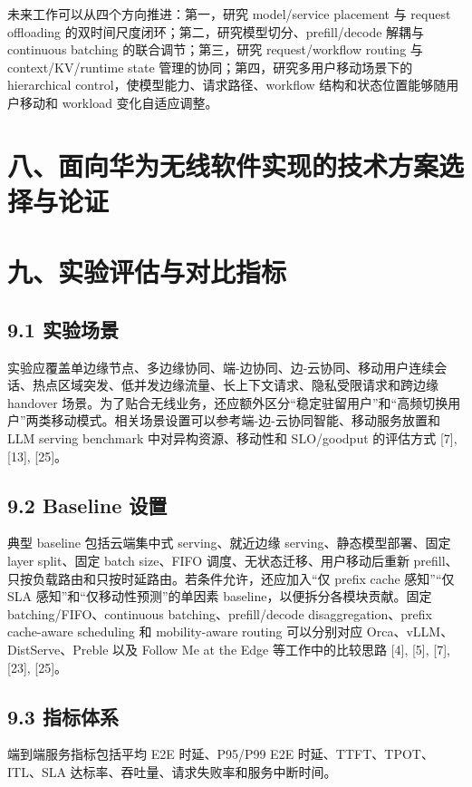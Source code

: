 \documentclass[a4paper,twocolumn,10pt]{ctexart}
\begin{document}
未来工作可以从四个方向推进：第一，研究 model/service placement 与 request offloading 的双时间尺度闭环；第二，研究模型切分、prefill/decode 解耦与 continuous batching 的联合调节；第三，研究 request/workflow routing 与 context/KV/runtime state 管理的协同；第四，研究多用户移动场景下的 hierarchical control，使模型能力、请求路径、workflow 结构和状态位置能够随用户移动和 workload 变化自适应调整。


\section{八、面向华为无线软件实现的技术方案选择与论证}

\section{九、实验评估与对比指标}

\subsection{9.1 实验场景}

实验应覆盖单边缘节点、多边缘协同、端-边协同、边-云协同、移动用户连续会话、热点区域突发、低并发边缘流量、长上下文请求、隐私受限请求和跨边缘 handover 场景。为了贴合无线业务，还应额外区分“稳定驻留用户”和“高频切换用户”两类移动模式。相关场景设置可以参考端-边-云协同智能、移动服务放置和 LLM serving benchmark 中对异构资源、移动性和 SLO/goodput 的评估方式 [7], [13], [25]。


\subsection{9.2 Baseline 设置}

典型 baseline 包括云端集中式 serving、就近边缘 serving、静态模型部署、固定 layer split、固定 batch size、FIFO 调度、无状态迁移、用户移动后重新 prefill、只按负载路由和只按时延路由。若条件允许，还应加入“仅 prefix cache 感知”“仅 SLA 感知”和“仅移动性预测”的单因素 baseline，以便拆分各模块贡献。固定 batching/FIFO、continuous batching、prefill/decode disaggregation、prefix cache-aware scheduling 和 mobility-aware routing 可以分别对应 Orca、vLLM、DistServe、Preble 以及 Follow Me at the Edge 等工作中的比较思路 [4], [5], [7], [23], [25]。


\subsection{9.3 指标体系}

端到端服务指标包括平均 E2E 时延、P95/P99 E2E 时延、TTFT、TPOT、ITL、SLA 达标率、吞吐量、请求失败率和服务中断时间。
\end{document}
